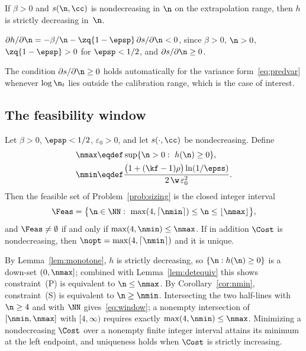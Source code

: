 \begin{Lemma}
\label{lem:monotone}
If $\beta>0$ and $s(\n,\cc)$ is nondecreasing in $\n$ on the extrapolation
range, then $h$ is strictly decreasing in~$\n$.
\end{Lemma}

\begin{Proof}
$\partial h/\partial\n=-\beta/\n-\zq{1-\epsp}\,\partial s/\partial\n<0$, since
$\beta>0$, $\n>0$, $\zq{1-\epsp}>0$ for $\epsp<1/2$, and
$\partial s/\partial\n\ge0$.
\end{Proof}

The condition $\partial s/\partial\n\ge0$ holds automatically for the variance
form~\eqref{eq:predvar} whenever $\log\n_{t}$ lies outside the calibration
range, which is the case of interest.

\subsection{The feasibility window}

\begin{Theorem}
\label{thm:window}
Let $\beta>0$, $\epsp<1/2$, $\varepsilon_{0}>0$, and let $s(\cdot,\cc)$ be
nondecreasing. Define
\begin{align}
\nmax &\eqdef\sup\{\n>0:\ h(\n)\ge0\},
\label{eq:nmax}\\
\nmin &\eqdef\frac{\bigl(1+(\kf-1)\rho\bigr)\ln(1/\epss)}
                  {2\,\w\,\varepsilon_{0}^{2}} .
\label{eq:nmin-repeat}
\end{align}
Then the feasible set of Problem~\ref{prob:sizing} is the closed integer
interval
\begin{equation}
\Feas=\bigl\{\n\in\NN:\ \max(4,\lceil\nmin\rceil)\le\n\le\lfloor\nmax\rfloor
\bigr\},
\label{eq:window}
\end{equation}
and $\Feas\ne\emptyset$ if and only if $\max(4,\nmin)\le\nmax$. If in addition
$\Cost$ is nondecreasing, then $\nopt=\max(4,\lceil\nmin\rceil)$ and it is
unique.
\end{Theorem}

\begin{Proof}
By Lemma~\ref{lem:monotone}, $h$ is strictly decreasing, so
$\{\n:h(\n)\ge0\}$ is a down-set $(0,\nmax]$; combined with
Lemma~\ref{lem:detequiv} this shows constraint~(P) is equivalent to
$\n\le\nmax$. By Corollary~\ref{cor:nmin}, constraint~(S) is equivalent to
$\n\ge\nmin$. Intersecting the two half-lines with $\n\ge4$ and with $\NN$
gives~\eqref{eq:window}; a nonempty intersection of $[\nmin,\nmax]$ with
$[4,\infty)$ requires exactly $\max(4,\nmin)\le\nmax$. Minimizing a
nondecreasing $\Cost$ over a nonempty finite integer interval attains its
minimum at the left endpoint, and uniqueness holds when $\Cost$ is strictly
increasing.
\end{Proof}

